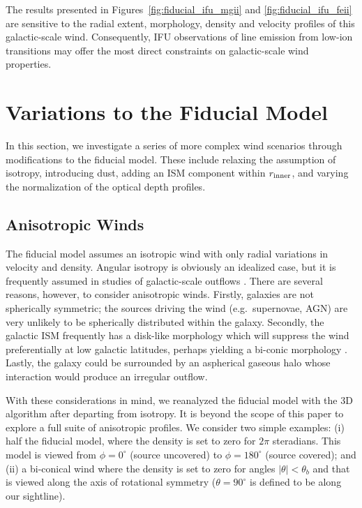 \documentclass[12pt,preprint]{aastex}
\begin{document}
The results presented in Figures~\ref{fig:fiducial_ifu_mgii} and
\ref{fig:fiducial_ifu_feii} are sensitive to the radial extent,
morphology, density and velocity profiles of this galactic-scale
wind.  Consequently, IFU observations of line emission from low-ion
transitions may offer the most direct constraints on galactic-scale
wind properties. 


\section{Variations to the Fiducial Model}
\label{sec:variants}

In this section, we investigate a series of more complex wind
scenarios
through modifications to the fiducial model.  These include relaxing
the assumption of isotropy, introducing dust, adding an ISM
component within $r_{\rm inner}$, and varying the normalization of the
optical depth profiles.

\subsection{Anisotropic Winds}
\label{sec:anisotropic}

The fiducial model assumes an
isotropic wind with only radial variations in velocity and density. 
Angular isotropy is obviously an idealized case, but
it is frequently assumed in studies of galactic-scale outflows
\citep[e.g.][]{steidel+10}.   There are several reasons, however, to
consider anisotropic winds.  Firstly, galaxies are not spherically
symmetric;  the sources driving the
wind (e.g.\ supernovae, AGN) are very unlikely to be spherically distributed
within the galaxy.  
Secondly, the galactic ISM frequently has a disk-like morphology
which will suppress the wind preferentially at low galactic latitudes,
perhaps yielding a bi-conic morphology \citep[e.g.][]{ham90,wws02}.
Lastly, the galaxy could be surrounded by an
aspherical gaseous halo whose interaction would produce an irregular 
outflow.

With these considerations in mind, we reanalyzed the fiducial model
with the 3D algorithm after departing from isotropy.  It is beyond the
scope of this paper to explore a full suite of anisotropic profiles.
We consider two simple examples: (i) half the fiducial model, where 
the density is set to zero for $2\pi$ steradians.  This model is
viewed from $\phi = 0^\circ$ (source uncovered) 
to $\phi = 180^\circ$ (source covered); and 
(ii) a bi-conical wind where the density is set to zero for angles
$|\theta| < \theta_b$ and that is viewed along the axis of rotational
symmetry ($\theta = 90^\circ$ is defined to be along our sightline).
\end{document}
